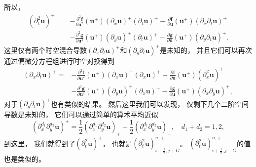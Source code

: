 所以，
\begin{equation}
  \label{eq:B-1}
  \begin{aligned}
    \left({\partial_{t}^2} {\bm{u}}\right)^+ =
     & -\frac{\partial^2{\bm{f}}}{\partial{\bm{u}}^2}({\bm{u}}^+) \left({\partial_{x}}{\bm{u}}\right)^+ \left({\partial_{t}}{\bm{u}}\right)^+ -\frac{\partial{\bm{f}}}{\partial{\bm{u}}}({\bm{u}}^+) \left({\partial_{x}}{\partial_{t}}{\bm{u}}\right)^+   \\
     & -\frac{\partial^2{\bm{g}}}{\partial{\bm{u}}^2}({\bm{u}}^+) \left({\partial_{y}}{\bm{u}}\right)^+ \left({\partial_{t}}{\bm{u}}\right)^+ -\frac{\partial{\bm{g}}}{\partial{\bm{u}}}({\bm{u}}^+) \left({\partial_{y}}{\partial_{t}}{\bm{u}}\right)^+.
  \end{aligned}
\end{equation}
这里仅有两个时空混合导数$\left({\partial_{x}}{\partial_{t}}{\bm{u}}\right)^+$和$\left({\partial_{y}}{\partial_{t}}{\bm{u}}\right)^+$是未知的，
并且它们可以再次通过偏微分方程组进行时空对换得到
\begin{equation}
  \label{eq:B-2}
  \begin{aligned}
    \left({\partial_{x}}{\partial_{t}} {\bm{u}}\right)^+ =
     & -\frac{\partial^2{\bm{f}}}{\partial{\bm{u}}^2}({\bm{u}}^+) \left({\partial_{x}}{\bm{u}}\right)^+ \left({\partial_{x}}{\bm{u}}\right)^+ -\frac{\partial{\bm{f}}}{\partial{\bm{u}}}({\bm{u}}^+) \left({\partial_{x}^2}{\bm{u}}\right)^+               \\
     & -\frac{\partial^2{\bm{g}}}{\partial{\bm{u}}^2}({\bm{u}}^+) \left({\partial_{y}}{\bm{u}}\right)^+ \left({\partial_{x}}{\bm{u}}\right)^+ -\frac{\partial{\bm{g}}}{\partial{\bm{u}}}({\bm{u}}^+) \left({\partial_{x}}{\partial_{y}}{\bm{u}}\right)^+,
  \end{aligned}
\end{equation}
对于$\left({\partial_{y}}{\partial_{t}}{\bm{u}}\right)^+$也有类似的结果。
然后这里我们可以发现，
仅剩下几个二阶空间导数是未知的，
它们可以通过简单的算术平均近似
\begin{equation}
  \label{eq:B-3}
  \left({\partial_{x}^{d_1}}{\partial_{y}^{d_2}}{\bm{u}}\right)^+ = \frac12 \left({\partial_{x}^{d_1}}{\partial_{y}^{d_2}}{\bm{u}}\right)_+ + \frac12 \left({\partial_{x}^{d_1}}{\partial_{y}^{d_2}}{\bm{u}}\right)_-, \quad d_1+d_2=1,2,
\end{equation}
到这里，
我们就得到了$\left({\partial_{t}^2} {\bm{u}}\right)^+$，
也就是$\left({\partial_{t}^2} {\bm{u}}\right)_{i+\frac{1}{2}, j+G}^{n,+}$。
$\left({\partial_{t}^2} {\bm{u}}\right)_{i+\frac{1}{2}, j-G}^{n,+}$的值也是类似的。

